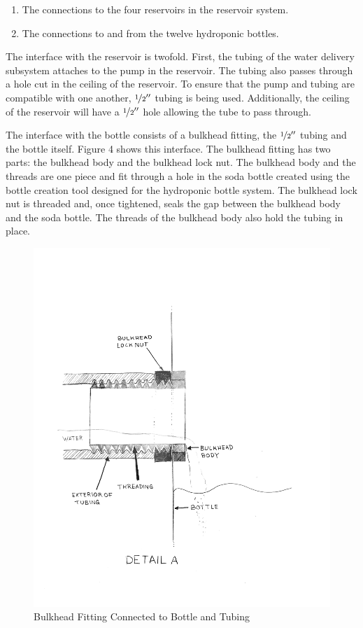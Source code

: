 \documentclass[12pt]{article}
\begin{document}
\begin{enumerate}
    \item The connections to the four reservoirs in the reservoir system.
    \item The connections to and from the twelve hydroponic bottles.
\end{enumerate}

The interface with the reservoir is twofold. First, the tubing of the water delivery subsystem
attaches to the pump in the reservoir. The tubing also passes through a hole cut in the ceiling of
the reservoir. To ensure that the pump and tubing are compatible with one another,
$\nicefrac{1}{2}''$ tubing is being used. Additionally, the ceiling of the reservoir will have a
$\nicefrac{1}{2}''$ hole allowing the tube to pass through.

The interface with the bottle consists of a bulkhead fitting, the $\nicefrac{1}{2}''$ tubing and the
bottle itself. Figure 4 shows this interface. The bulkhead fitting has two parts: the bulkhead
body and the bulkhead lock nut. The bulkhead body and the threads are one piece and fit through a
hole in the soda bottle created using the bottle creation tool designed for the hydroponic bottle
system. The bulkhead lock nut is threaded and, once tightened, seals the gap between the bulkhead
body and the soda bottle. The threads of the bulkhead body also hold the tubing in place.

\begin{figure}[H]
    \centering
    \includegraphics[width=163mm]{resources/detail-a.png}
    \caption{Bulkhead Fitting Connected to Bottle and Tubing}
\end{figure}
\end{document}
